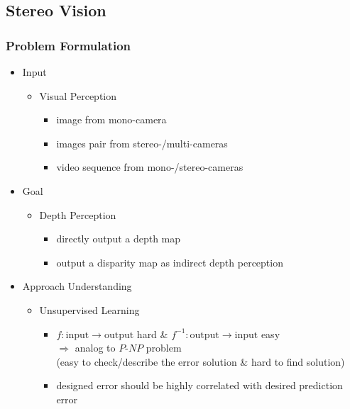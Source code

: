 \subsection{Stereo Vision}
\subsubsection{Problem Formulation}
\begin{itemize}
\item Input
	\begin{itemize}
	\item Visual Perception
		\begin{itemize}
		\item image from mono-camera
		\item images pair from stereo-/multi-cameras
		\item video sequence from mono-/stereo-cameras
		\end{itemize}
	\end{itemize}
\item Goal
	\begin{itemize}
	\item Depth Perception
		\begin{itemize}
		\item directly output a depth map
		\item output a disparity map as indirect depth perception
		\end{itemize}
	\end{itemize} 
\item Approach Understanding
	\begin{itemize}
	\item Unsupervised Learning
		\begin{itemize}
		\item $f: \text{input}\rightarrow\text{output}$ hard \& $f^{-1}: \text{output}\rightarrow\text{input}$ easy \\
		$\Rightarrow$ analog to $P$-$NP$ problem \\
		(easy to check/describe the error solution \& hard to find solution)
		\item designed error should be highly correlated with desired prediction error
		\end{itemize}
	\end{itemize}
\end{itemize}
